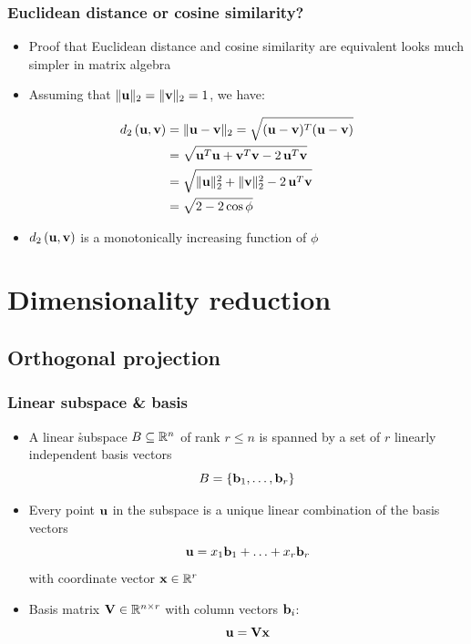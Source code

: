 \documentclass[t]{beamer} %
\begin{document}
\begin{frame}[fragile]
  \frametitle{Euclidean distance or cosine similarity?}

  \begin{itemize}
  \item Proof that Euclidean distance and cosine similarity are equivalent looks much simpler in matrix algebra
  \item Assuming that $\norm[2]{\vu} = \norm[2]{\vv} = 1$, we have:
  \end{itemize}

  \ungap[1]
  \begin{align*}
    \dist[2]{\vu}{\vv} 
    &= \norm[2]{\vu - \vv}
    = \sqrt{(\vu - \vv)^T (\vu - \vv)}
    \\
    &= \sqrt{\vu^T \vu + \vv^T \vv - 2\, \vu^T \vv}
    \\
    &= \sqrt{\norm[2]{\vu}^2 + \norm[2]{\vv}^2 - 2\, \vu^T \vv}
    \\
    &= \sqrt{2 - 2 \cos \phi}
  \end{align*}
  \ungap
  \begin{itemize}
  \item[\hand] $\dist[2]{\vu}{\vv}$ is a monotonically increasing function of $\phi$
  \end{itemize}
\end{frame}


\section{Dimensionality reduction}

\subsection{Orthogonal projection}

\begin{frame}
  \frametitle{Linear subspace \& basis}
  
  \begin{itemize}
  \item A linear \h{subspace} $B\subseteq \mathbb{R}^n$ of rank $r\leq n$ is spanned by a set of $r$ linearly independent basis vectors
    \[
    B = \set{\vb_1, \ldots, \vb_r}
    \]
  \item<2-> Every point $\vu$ in the subspace is a unique linear combination of the basis vectors
    \[
    \vu = x_1 \vb_1 + \ldots + x_r \vb_r
    \]
    with coordinate vector $\vx\in \setR^r$
  \item<3-> Basis matrix $\mathbf{V} \in \mathbb{R}^{n\times r}$ with column vectors $\vb_i$:
    \[
    \vu = \mathbf{V} \vx 
    \]
  \end{itemize}
\end{frame}
\end{document}
